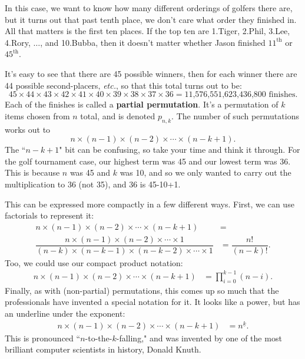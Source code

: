 In this case, we want to know how many different orderings of golfers there
are, but it turns out that past tenth place, we don't care what order they
finished in. All that matters is the first ten places. If the top ten are
1.Tiger, 2.Phil, 3.Lee, 4.Rory, $\dots$, and 10.Bubba, then it doesn't
matter whether Jason finished $11^{\text{th}}$ or $45^{\text{th}}$.

It's easy to see that there are 45 possible winners, then for each winner
there are 44 possible second-placers, \textit{etc.}, so that this total
turns out to be:
{\small
\[
45 \times 44 \times 43 \times 42 \times 41 \times 40 \times 39 \times 38
\times 37 \times 36 = \text{11,576,551,623,436,800 finishes}.
\]
}
Each of the finishes is called a \textbf{partial permutation}. It's a
permutation of $k$ items chosen from $n$ total, and is denoted $p_{n,k}$.
The number of such permutations works out to
\[
n \times (n-1) \times (n-2) \times \cdots \times (n-k+1).
\]
The ``$n-k+1$" bit can be confusing, so take your time and think it
through. For the golf tournament case, our highest term was 45 and our
lowest term was 36. This is because $n$ was 45 and $k$ was 10, and so we
only wanted to carry out the multiplication to 36 (not 35), and 36 is
45-10+1.

This can be expressed more compactly in a few different ways. First,
we can use factorials to represent it:
\begin{align*}
n \times (n-1) \times (n-2) \times \cdots \times (n-k+1) &= \\
\dfrac{n \times (n-1) \times (n-2) \times \cdots \times 1}{(n-k) \times (n-k-1) \times (n-k-2) \times \cdots \times 1} &= \dfrac{n!}{(n-k)!}.
\end{align*}
Too, we could use our compact product notation:
\begin{align*}
n \times (n-1) \times (n-2) \times \cdots \times (n-k+1) &= 
\prod_{i=0}^{k-1}{(n-i)}.
\end{align*}
Finally, as with (non-partial) permutations, this comes up so much that
the professionals have invented a special notation for it. It looks like a
power, but has an underline under the exponent:
\begin{align*}
n \times (n-1) \times (n-2) \times \cdots \times (n-k+1) &= 
n^{\underline{k}}.
\end{align*}
This is pronounced ``$n$-to-the-$k$-falling," and was invented by one of
the most brilliant computer scientists in history, Donald Knuth.

